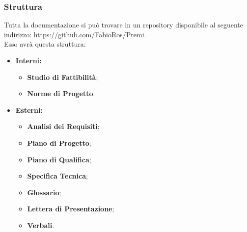 		\subsubsection{Struttura}
Tutta la documentazione si può trovare in un \gls{repository} disponibile al seguente indirizzo: \url{https://github.com/FabioRos/Premi}. \\
Esso avrà questa struttura:
\begin{itemize}
	\item \textbf{Interni:}
		\begin{itemize}
				\item \textbf{Studio di Fattibilità};
				\item \textbf{Norme di Progetto}.
		\end{itemize}
	\item \textbf{Esterni:}
		\begin{itemize}
				\item \textbf{Analisi dei Requisiti};
				\item \textbf{Piano di Progetto};
				\item \textbf{Piano di Qualifica};
				\item \textbf{Specifica Tecnica};
				\item \textbf{Glossario};
				\item \textbf{Lettera di Presentazione};
				\item \textbf{Verbali}.
		\end{itemize}
\end{itemize}


